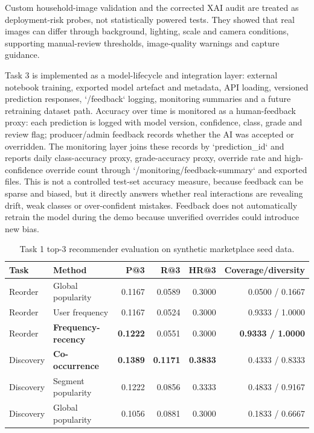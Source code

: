 \documentclass[11pt,a4paper]{article}
\begin{document}
Custom household-image validation and the corrected XAI audit are treated as deployment-risk probes, not statistically powered tests. They showed that real images can differ through background, lighting, scale and camera conditions, supporting manual-review thresholds, image-quality warnings and capture guidance.

Task 3 is implemented as a model-lifecycle and integration layer: external notebook training, exported model artefact and metadata, API loading, versioned prediction responses, `/feedback` logging, monitoring summaries and a future retraining dataset path. Accuracy over time is monitored as a human-feedback proxy: each prediction is logged with model version, confidence, class, grade and review flag; producer/admin feedback records whether the AI was accepted or overridden. The monitoring layer joins these records by `prediction\_id` and reports daily class-accuracy proxy, grade-accuracy proxy, override rate and high-confidence override count through `/monitoring/feedback-summary` and exported files. This is not a controlled test-set accuracy measure, because feedback can be sparse and biased, but it directly answers whether real interactions are revealing drift, weak classes or over-confident mistakes. Feedback does not automatically retrain the model during the demo because unverified overrides could introduce new bias.

\begin{table}[ht]
\centering
\small
\caption{Task 1 top-3 recommender evaluation on synthetic marketplace seed data.}
\begin{tabular}{llrrrr}
\toprule
Task & Method & P@3 & R@3 & HR@3 & Coverage/diversity \\
\midrule
Reorder & Global popularity & 0.1167 & 0.0589 & 0.3000 & 0.0500 / 0.1667 \\
Reorder & User frequency & 0.1167 & 0.0524 & 0.3000 & 0.9333 / 1.0000 \\
Reorder & \textbf{Frequency-recency} & \textbf{0.1222} & 0.0551 & 0.3000 & \textbf{0.9333 / 1.0000} \\
\midrule
Discovery & \textbf{Co-occurrence} & \textbf{0.1389} & \textbf{0.1171} & \textbf{0.3833} & 0.4333 / 0.8333 \\
Discovery & Segment popularity & 0.1222 & 0.0856 & 0.3333 & 0.4833 / 0.9167 \\
Discovery & Global popularity & 0.1056 & 0.0881 & 0.3000 & 0.1833 / 0.6667 \\
\bottomrule
\end{tabular}
\end{table}
\end{document}
